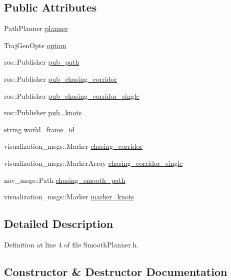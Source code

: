 \subsection*{Public Attributes}
\begin{DoxyCompactItemize}
\item 
Path\+Planner \hyperlink{class_smooth_planner_aa9df69d4f514c7338ab2d066d38dd1a2}{planner}
\item 
Traj\+Gen\+Opts \hyperlink{class_smooth_planner_af0c954aea3c6b5b82a160ed4be93fb17}{option}
\item 
ros\+::\+Publisher \hyperlink{class_smooth_planner_a7b8400f711456291e567d0fc204c274b}{pub\+\_\+path}
\item 
ros\+::\+Publisher \hyperlink{class_smooth_planner_a7cd9de34963f445a21a6d0101346b071}{pub\+\_\+chasing\+\_\+corridor}
\item 
ros\+::\+Publisher \hyperlink{class_smooth_planner_a2f023865c692f4fdaa830204fc533018}{pub\+\_\+chasing\+\_\+corridor\+\_\+single}
\item 
ros\+::\+Publisher \hyperlink{class_smooth_planner_a7ee67bceac6d60409542a2250b2ccd08}{pub\+\_\+knots}
\item 
string \hyperlink{class_smooth_planner_ade278c4209b962d8342a2ee30e718c8b}{world\+\_\+frame\+\_\+id}
\item 
visualization\+\_\+msgs\+::\+Marker \hyperlink{class_smooth_planner_addf7aab458c1407f23e3544bd76ac82b}{chasing\+\_\+corridor}
\item 
visualization\+\_\+msgs\+::\+Marker\+Array \hyperlink{class_smooth_planner_acb1a985fe214b76a1a6d7462ad3ddf80}{chasing\+\_\+corridor\+\_\+single}
\item 
nav\+\_\+msgs\+::\+Path \hyperlink{class_smooth_planner_a6a33038c6041ff972bea7765780b56d0}{chasing\+\_\+smooth\+\_\+path}
\item 
visualization\+\_\+msgs\+::\+Marker \hyperlink{class_smooth_planner_afeeab9ce830d4960babdc84c82da94ea}{marker\+\_\+knots}
\end{DoxyCompactItemize}


\subsection{Detailed Description}


Definition at line 4 of file Smooth\+Planner.\+h.



\subsection{Constructor \& Destructor Documentation}
